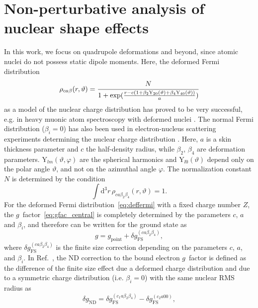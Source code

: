 \section{Non-perturbative analysis of nuclear shape effects}
\label{sec:gfac_shape}
In this work, we focus on quadrupole deformations and beyond, since atomic nuclei do not possess static dipole moments. Here, the deformed Fermi distribution
\begin{equation}
\rho_{ca\beta}(r,\vartheta)=\cfrac{N}{1+\text{exp}(\frac{r-c(1+\beta_2 \text{Y}_{20}(\vartheta)+\beta_4 \text{Y}_{40}(\vartheta))}{a})}
\label{eq:deffermi}
\end{equation}
as a model of the nuclear charge distribution has proved to be very successful, e.g. in heavy muonic atom spectroscopy with deformed nuclei \cite{hitlin1970,tanaka1984}. The normal Fermi distribution (${\beta_i}{=}{0}$) has also been used in electron-nucleus scattering experiments determining the nuclear charge distribution \cite{hahn1956}. Here, $a$ is a skin thickness parameter and $c$ the half-density radius, while $\beta_2$, $\beta_4$ are deformation parameters. $\text{Y}_{lm}(\vartheta,\varphi)$ are the spherical harmonics and $\text{Y}_{l0}(\vartheta)$ depend only on the polar angle $\vartheta$, and not on the azimuthal angle $\varphi$. The normalization constant $N$ is determined by the condition
\begin{equation}
\int \text{d}^3r\, \rho_{ca\beta_2\beta_4}(r,\vartheta)=1.
\end{equation}%
For the deformed Fermi distribution~\eqref{eq:deffermi} with a fixed charge number $Z$, the $g$~factor~\eqref{eq:gfac_central} is completely determined by the parameters $c$, $a$ and $\beta_i$, and therefore can be written for the ground state as
\begin{equation}
g = g_{\text{point}} + \delta g^{(ca\beta_2\beta_4)}_{\text{FS}},
\label{eq:finiteDef}
\end{equation}
where $\delta g^{(ca\beta_2\beta_4)}_{\text{FS}}$ is the finite size correction depending on the parameters $c$, $a$, and $\beta_i$. In Ref.~\cite{jacek2012}, the ND correction to the bound electron $g$~factor is defined as the difference of the finite size effect due a deformed charge distribution and due to a symmetric charge distribution (i.e. ${\beta_i}{=}{0}$) with the same nuclear RMS radius as
\begin{equation}
\delta g_{\text{ND}}=\delta g^{(c_1a\beta_2\beta_4)}_{\text{FS}} - \delta g^{(c_2a00)}_{\text{FS}},
\label{eq:defdgnd}
\end{equation}
